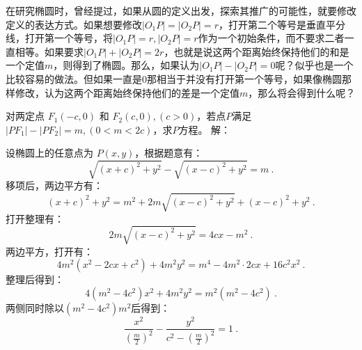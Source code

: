 在研究椭圆时，曾经提过，如果从圆的定义出发，探索其推广的可能性，就要修改定义的表达方式。如果想要修改$|O_1P|=|O_2P|=r$，打开第二个等号是垂直平分线，打开第一个等号，将$|O_1P|=r,|O_2P|=r$作为一个初始条件，而不要求二者一直相等。如果要求$|O_1P|+|O_2P|=2r$，也就是说这两个距离始终保持他们的和是一个定值$m$，则得到了椭圆。那么，如果认为$|O_1P|-|O_2P|=0$呢？似乎也是一个比较容易的做法。但如果一直是$0$那相当于并没有打开第一个等号，如果像椭圆那样修改，认为这两个距离始终保持他们的差是一个定值$m$，那么将会得到什么呢？


\begin{example}{对两定点 $F_1(-c, 0)$ 和 $F_2(c, 0),(c>0)$，若点$P$满足$|PF_1| - |PF_2| = m,(0<m <2c)$，求$P$方程。}
解：

设椭圆上的任意点为 $P(x, y)$，根据题意有：
\begin{equation}
\sqrt{(x + c)^2 + y^2} - \sqrt{(x - c)^2 + y^2} = m~.
\end{equation}
移项后，两边平方有：
\begin{equation}
(x + c)^2 + y^2 = m^2 + 2m\sqrt{(x - c)^2 + y^2} + (x - c)^2 + y^2~.
\end{equation}
打开整理有：
\begin{equation}
2m\sqrt{(x - c)^2 + y^2}= 4cx - m^2~.
\end{equation}
两边平方，打开有：
\begin{equation}
4m^2(x^2 - 2cx+c^2) + 4m^2y^2= m^4-4m^2\cdot2cx+16c^2x^2~.
\end{equation}
整理后得到：
\begin{equation}
4(m^2 -4c^2)x^2 + 4m^2y^2= m^2(m^2-4c^2)~.
\end{equation}
两侧同时除以$(m^2-4c^2)m^2$后得到：
\begin{equation}\label{eq_Hypb3_3}
\frac{x^2}{\left(\displaystyle\frac{m}{2}\right)^2} -\frac{y^2}{\displaystyle c^2-\left(\frac{m}{2}\right)^2}=1~.
\end{equation}
\end{example}

